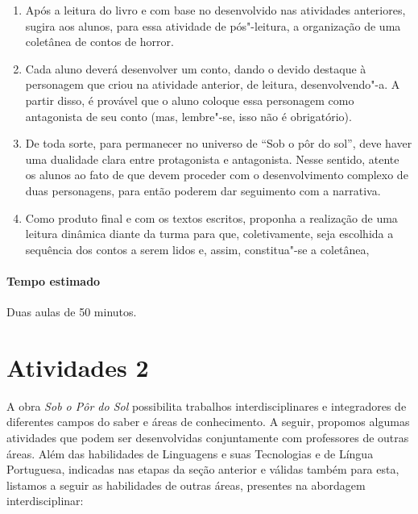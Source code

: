 \documentclass[12pt]{extarticle}
\begin{document}
\begin{enumerate}
\item	
Após a leitura do livro e com base no desenvolvido nas atividades
anteriores, sugira aos alunos, para essa atividade de pós"-leitura, a organização de uma coletânea de contos
de horror. 

\item
Cada aluno deverá desenvolver um conto, dando o devido
destaque à personagem que criou na atividade anterior, de leitura, desenvolvendo"-a. A
partir disso, é provável que o aluno coloque essa personagem como
antagonista de seu conto (mas, lembre"-se, isso não é obrigatório).

\item
De toda sorte, para permanecer no universo de ``Sob o pôr do sol'', deve haver
uma dualidade clara entre protagonista e antagonista. Nesse sentido,
atente os alunos ao fato de que devem proceder com o desenvolvimento
complexo de duas personagens, para então poderem dar seguimento com a
narrativa. 

\item
Como produto final e com os textos escritos, proponha a realização de uma
leitura dinâmica diante da turma para que, coletivamente, seja escolhida a sequência dos contos a serem lidos 
e, assim, constitua"-se a coletânea, 

\end{enumerate}

\paragraph{Tempo estimado} Duas aulas de 50 minutos. 


\section{Atividades 2}

A obra \emph{Sob o Pôr do Sol} possibilita trabalhos interdisciplinares
e integradores de diferentes campos do saber e áreas de conhecimento. A
seguir, propomos algumas atividades que podem ser desenvolvidas
conjuntamente com professores de outras áreas. Além das habilidades de
Linguagens e suas Tecnologias e de Língua Portuguesa, indicadas nas
etapas da seção anterior e válidas também para esta, listamos a seguir
as habilidades de outras áreas, presentes na abordagem interdisciplinar:

\end{document}
